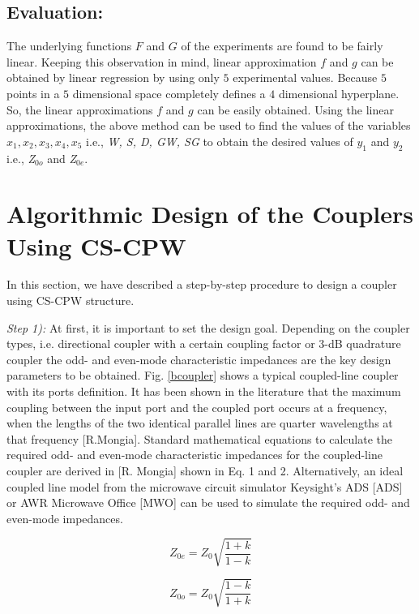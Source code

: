 \documentclass[journal]{IEEEtran}
\begin{document}
\subsection{Evaluation:}
The underlying functions $F$ and $G$ of the experiments are found to be fairly linear. Keeping this observation in mind, linear approximation $f$ and $g$ can be obtained by linear regression by using only $5$ experimental values. Because $5$ points in a $5$ dimensional space completely defines a $4$ dimensional hyperplane. So, the linear approximations $f$ and $g$ can be easily obtained. Using the linear approximations, the above method can be used to find the values of the variables $x_1,x_2,x_3,x_4,x_5$ i.e., \textit{W, S, D, GW, SG} to obtain the desired values of $y_1$ and $y_2$ i.e., \textit{Z$_{0o}$} and \textit{Z$_{0e}$}. 



\section{Algorithmic Design of the Couplers Using CS-CPW}

In this section, we have described a step-by-step procedure to design a coupler using CS-CPW structure. 

\textit{Step 1):} At first, it is important to set the design goal. Depending on the coupler types, i.e. directional coupler with a certain coupling factor or 3-dB quadrature coupler the odd- and even-mode characteristic impedances are the key design parameters to be obtained. Fig. \ref{bcoupler} shows a typical coupled-line coupler with its ports definition. It has been shown in the literature that the maximum coupling between the input port and the coupled port occurs at a frequency, when the lengths of the two identical parallel lines are quarter wavelengths at that frequency [R.Mongia]. Standard mathematical equations to calculate the required odd- and even-mode characteristic impedances for the coupled-line coupler are derived in [R. Mongia] shown in Eq. 1 and 2. Alternatively, an ideal coupled line model from the microwave circuit simulator Keysight's ADS [ADS] or AWR Microwave Office [MWO] can be used to simulate the required odd- and even-mode impedances.

\begin{equation}
Z_{0e}=Z_0 \sqrt{\frac{1+k}{1-k}}
\end{equation}

\begin{equation}
Z_{0o}=Z_0 \sqrt{\frac{1-k}{1+k}}
\end{equation}
\end{document}
